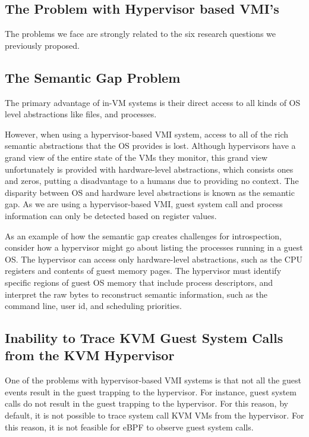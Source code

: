 \documentclass{report}
\begin{document}
\begin{spacing}{1.5}
{}




\section{The Problem with Hypervisor based VMI's}

{\large
The problems we face are strongly related to the six research questions we previously proposed.
\newline
}

\subsection{The Semantic Gap Problem}

{\large
The primary advantage of in-VM systems is their direct access to all kinds of OS level abstractions like files, and processes.


However, when using a hypervisor-based VMI system, access to all of the rich semantic abstractions that the OS provides is lost. Although hypervisors have a grand view of the entire state of the VMs they monitor, this grand view unfortunately is provided with hardware-level abstractions, which consists ones and zeros, putting a disadvantage to a humans due to providing no context. The disparity between OS and hardware level abstractions is known as the semantic gap. As we are using a hypervisor-based VMI, guest system call and process information can only be detected based on register values.

As an example of how the semantic gap creates challenges for introspection, consider how a hypervisor might
go about listing the processes running in a guest OS. The hypervisor can access only hardware-level abstractions, such
as the CPU registers and contents of guest memory pages. The hypervisor must identify specific regions of guest OS memory that include process descriptors, and interpret the raw bytes to reconstruct semantic information, such as the
command line, user id, and scheduling priorities.
\newline
}


\subsection{Inability to Trace KVM Guest System Calls from the KVM Hypervisor}

{\large
One of the problems with hypervisor-based VMI systems is that not all the guest events result in the guest trapping to the hypervisor. For instance, guest system calls do not result in the guest trapping to the hypervisor. For this reason, by default, it is not possible to trace system call KVM VMs from the hypervisor. For this reason, it is not feasible for eBPF to observe guest system calls.
\newline
}








\end{spacing}
\end{document}
